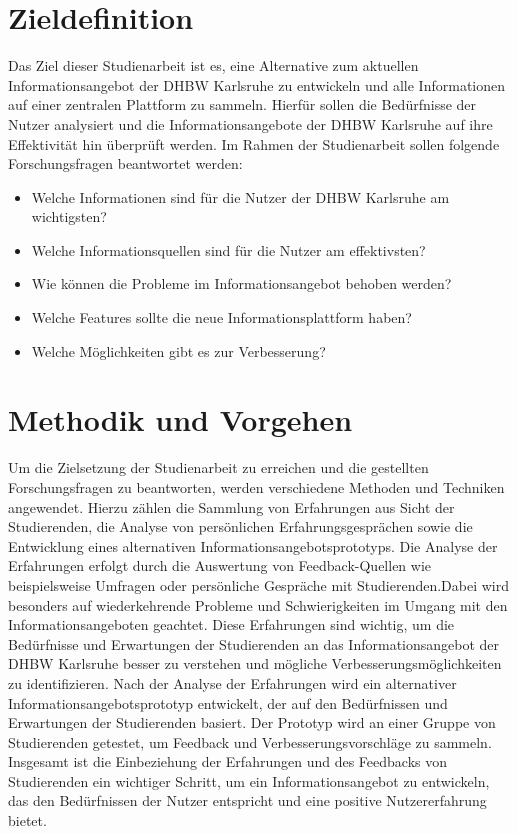 \section{Zieldefinition}
Das Ziel dieser Studienarbeit ist es, eine Alternative zum aktuellen Informationsangebot der DHBW Karlsruhe zu entwickeln und alle Informationen auf einer zentralen Plattform zu sammeln. Hierfür sollen die Bedürfnisse der Nutzer analysiert und die Informationsangebote der DHBW Karlsruhe auf ihre Effektivität hin überprüft werden.
Im Rahmen der Studienarbeit sollen folgende Forschungsfragen beantwortet werden:
\begin{itemize}
	\item Welche Informationen sind für die Nutzer der DHBW Karlsruhe am wichtigsten?
	\item Welche Informationsquellen sind für die Nutzer am effektivsten?
	\item Wie können die Probleme im Informationsangebot behoben werden?
	\item Welche Features sollte die neue Informationsplattform haben?
	\item Welche Möglichkeiten gibt es zur Verbesserung?
\end{itemize}

\section{Methodik und Vorgehen}
Um die Zielsetzung der Studienarbeit zu erreichen und die gestellten Forschungsfragen zu beantworten, werden verschiedene Methoden und Techniken angewendet. Hierzu zählen die Sammlung von Erfahrungen aus Sicht der Studierenden, die Analyse von persönlichen Erfahrungsgesprächen sowie die Entwicklung eines alternativen Informationsangebotsprototyps.
Die Analyse der Erfahrungen erfolgt durch die Auswertung von Feedback-Quellen wie beispielsweise Umfragen oder persönliche Gespräche mit Studierenden.Dabei wird besonders auf wiederkehrende Probleme und Schwierigkeiten im Umgang mit den Informationsangeboten geachtet. Diese Erfahrungen sind wichtig, um die Bedürfnisse und Erwartungen der Studierenden an das Informationsangebot der DHBW Karlsruhe besser zu verstehen und mögliche Verbesserungsmöglichkeiten zu identifizieren.
Nach der Analyse der Erfahrungen wird ein alternativer Informationsangebotsprototyp entwickelt, der auf den Bedürfnissen und Erwartungen der Studierenden basiert. Der Prototyp wird an einer Gruppe von Studierenden getestet, um Feedback und Verbesserungsvorschläge zu sammeln.
Insgesamt ist die Einbeziehung der Erfahrungen und des Feedbacks von Studierenden ein wichtiger Schritt, um ein Informationsangebot zu entwickeln, das den Bedürfnissen der Nutzer entspricht und eine positive Nutzererfahrung bietet.


